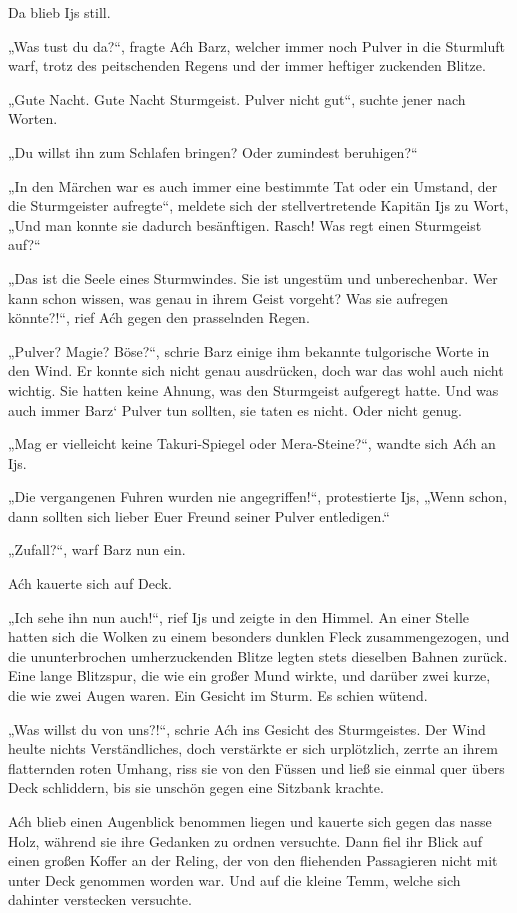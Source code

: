 Da blieb Ijs still.

„Was tust du da?“, fragte Aćh Barz, welcher immer noch Pulver in die Sturmluft warf, trotz des peitschenden Regens und der immer heftiger zuckenden Blitze.

„Gute Nacht. Gute Nacht Sturmgeist. Pulver nicht gut“, suchte jener nach Worten.

„Du willst ihn zum Schlafen bringen? Oder zumindest beruhigen?“

„In den Märchen war es auch immer eine bestimmte Tat oder ein Umstand, der die Sturmgeister aufregte“, meldete sich der stellvertretende Kapitän Ijs zu Wort, „Und man konnte sie dadurch besänftigen. Rasch! Was regt einen Sturmgeist auf?“

„Das ist die Seele eines Sturmwindes. Sie ist ungestüm und unberechenbar. Wer kann schon wissen, was genau in ihrem Geist vorgeht? Was sie aufregen könnte?!“, rief Aćh gegen den prasselnden Regen.

„Pulver? Magie? Böse?“, schrie Barz einige ihm bekannte tulgorische Worte in den Wind. Er konnte sich nicht genau ausdrücken, doch war das wohl auch nicht wichtig. Sie hatten keine Ahnung, was den Sturmgeist aufgeregt hatte. Und was auch immer Barz‘ Pulver tun sollten, sie taten es nicht. Oder nicht genug.

„Mag er vielleicht keine Takuri-Spiegel oder Mera-Steine?“, wandte sich Aćh an Ijs.

„Die vergangenen Fuhren wurden nie angegriffen!“, protestierte Ijs, „Wenn schon, dann sollten sich lieber Euer Freund seiner Pulver entledigen.“

„Zufall?“, warf Barz nun ein.

Aćh kauerte sich auf Deck.

„Ich sehe ihn nun auch!“, rief Ijs und zeigte in den Himmel. An einer Stelle hatten sich die Wolken zu einem besonders dunklen Fleck zusammengezogen, und die ununterbrochen umherzuckenden Blitze legten stets dieselben Bahnen zurück. Eine lange Blitzspur, die wie ein großer Mund wirkte, und darüber zwei kurze, die wie zwei Augen waren. Ein Gesicht im Sturm. Es schien wütend.

„Was willst du von uns?!“, schrie Aćh ins Gesicht des Sturmgeistes. Der Wind heulte nichts Verständliches, doch verstärkte er sich urplötzlich, zerrte an ihrem flatternden roten Umhang, riss sie von den Füssen und ließ sie einmal quer übers Deck schliddern, bis sie unschön gegen eine Sitzbank krachte.

Aćh blieb einen Augenblick benommen liegen und kauerte sich gegen das nasse Holz, während sie ihre Gedanken zu ordnen versuchte. Dann fiel ihr Blick auf einen großen Koffer an der Reling, der von den fliehenden Passagieren nicht mit unter Deck genommen worden war. Und auf die kleine Temm, welche sich dahinter verstecken versuchte.

